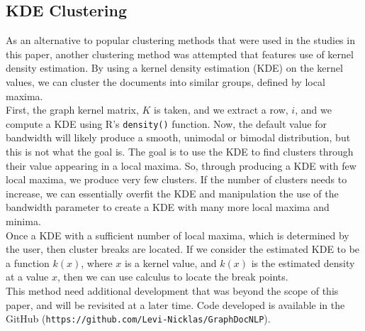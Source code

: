 \begin{appendices}
\chapter{KDE Clustering}
As an alternative to popular clustering methods that were used in the studies in this paper, another clustering method was attempted that features use of kernel density estimation. By using a kernel density estimation (KDE) on the kernel values, we can cluster the documents into similar groups, defined by local maxima. \\
First, the graph kernel matrix, $K$ is taken, and we extract a row, $i$, and we compute a KDE using R's \texttt{density()} function. Now, the default value for bandwidth will likely produce a smooth, unimodal or bimodal distribution, but this is not what the goal is. The goal is to use the KDE to find clusters through their value appearing in a local maxima. So, through producing a KDE with few local maxima, we produce very few clusters. If the number of clusters needs to increase, we can essentially overfit the KDE and manipulation the use of the bandwidth parameter to create a KDE with many more local maxima and minima.\\
Once a KDE with a sufficient number of local maxima, which is determined by the user, then cluster breaks are located. If we consider the estimated KDE to be a function $k(x)$, where $x$ is a kernel value, and $k(x)$ is the estimated density at a value $x$, then we can use calculus to locate the break points. \\
This method need additional development that was beyond the scope of this paper, and will be revisited at a later time. Code developed is available in the GitHub (\texttt{https://github.com/Levi-Nicklas/GraphDocNLP}).




\end{appendices}

